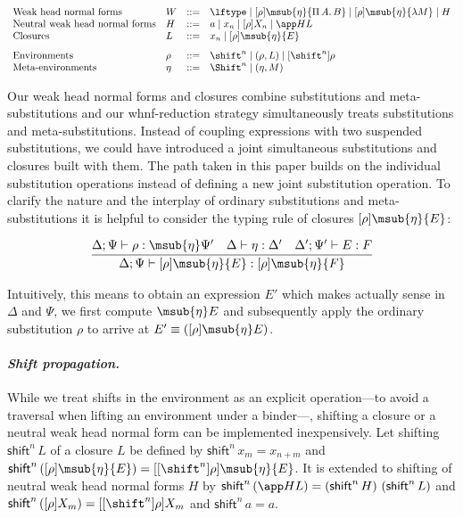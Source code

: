 \documentclass[copyright,creativecommons]{eptcs}
\newcommand{\para}[1]{\paragraph*{\it#1}}
\newcommand{\paradot}[1]{\para{#1.}}
\newcommand{\shiftby}[1]{\shift^{#1}}
\newcommand{\Shiftby}[1]{\Shift^{#1}}
\newcommand{\esub}[1]{[#1]}
\newcommand{\msubp}[2]{\msub{#1}(#2)}
\newcommand{\dsub}[3]{\esub{#1}{\msub{#2}{#3}}} \newcommand{\dsubp}[3]{\esub{#1}{\msubp{#2}{#3}}} \newcommand{\fun}[1]{\Pi\,#1.\,}
\newcommand{\shiftEnv}[1]{\esub{\shiftby{#1}}}
\newcommand{\tshift}{\mathsf{shift}}
\newcommand{\shiftClos}[1]{\tshift^{#1}\,}
\newcommand{\shiftClosp}[2]{\shiftClos{#1}{(#2)}}
\newcommand{\shiftNe}{\shiftClos}
\newcommand{\shiftNep}{\shiftClosp}
\begin{document}
\[
\begin{array}{llrl}
\mbox{Weak head normal forms} &
  W & ::= & \lftype
    \mid \dsub \rho \eta {\fun A B} 
    \mid \dsub \rho \eta {\lambda M}
    \mid H \\
\mbox{Neutral weak head normal forms} &
  H & ::= & a \mid x_n \mid \esub \rho {X_n} \mid \app H L 
\\
\mbox{Closures} &
  L & ::= & x_n \mid \dsub \rho \eta E 
\\[0.75em] 
\mbox{Environments} &
  \rho & ::= & \shiftby n \mid (\rho, L) \mid \esub {\shiftby n} \rho \\
\mbox{Meta-environments} &
  \eta & ::= & \Shiftby n \mid (\eta, M) \\
\end{array}
\]


Our weak head normal forms and closures combine substitutions and
meta-substitutions
and our whnf-reduction
strategy simultaneously treats substitutions and meta-substitutions. 
Instead of coupling expressions with two suspended substitutions, we
could have introduced a joint simultaneous substitutions and closures
built with them. The path taken in this paper builds on the individual
substitution operations instead of defining a new joint substitution
operation. To clarify the nature and the interplay of ordinary
substitutions and meta-substitutions it is helpful to
consider the typing rule of closures $\dsub \rho \eta E$:


\[
\begin{array}{c}
\infer{\Delta; \Psi \vdash \dsub \rho  \eta E :  \dsub \rho \eta F}
{  \Delta; \Psi \vdash \rho : \msub{\eta}\Psi' & 
 \Delta \vdash \eta : \Delta' & 
 \Delta' ; \Psi' \vdash E : F 
}
\end{array}
\]


Intuitively, this means to obtain an expression $E'$ which makes actually
sense in $\Delta$ and $\Psi$, we first compute $\msub{\eta}E$ and
subsequently apply the ordinary substitution $\rho$ to
arrive at $E' \equiv ([\rho]\msub{\eta}E)$. 


\paradot{Shift propagation}\label{abbrev-sclo}
While we treat shifts in the environment as an explicit
operation---to avoid a traversal when lifting an environment under a
binder---, shifting a closure or a neutral weak head normal form can
be implemented inexpensively.
Let shifting $\shiftClos n L$ of a closure $L$ be defined by
$\shiftClos n {x_m} = x_{n+m}$ and $\shiftClosp n {\dsub \rho \eta E} =
\dsub {\shiftEnv n \rho} \eta E$.  
It is extended to shifting of neutral weak head normal forms $H$ by 
$\shiftNep n {\app H L} = (\shiftNe n H) ~ (\shiftClos n L)$ and
$\shiftNep n {\esub \rho {X_m}} = \esub {\esub {\shiftby n} \rho}
{X_m}$ and $\shiftNe n a = a$.
\end{document}
